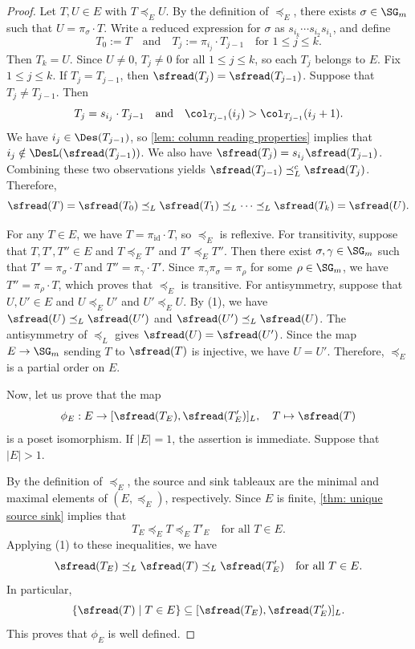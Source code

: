 \documentclass[12pt, reqno]{amsart}
\numberwithin{equation}{section}
\numberwithin{figure}{section}
\numberwithin{table}{section}
\theoremstyle{definition}
\begin{document}
\begin{proof}
Let $T,U \in E$ with $T \preceq_E U$.
By the definition of $\preceq_E$, there exists $\sigma \in \SG_m$ such that $U = \pi_\sigma \cdot T$.
Write a reduced expression for $\sigma$ as $s_{i_k}\cdots s_{i_2}s_{i_1}$, and define 
\[
T_0:=T 
\quad \text{and} \quad
T_j:=\pi_{i_j} \cdot T_{j-1}
\quad\text{for } 1 \le j \le k.
\]
Then $T_k = U$.
Since $U \ne 0$, $T_j \ne 0$ for all $1 \le j \le k$, so each $T_j$ belongs to $E$.
Fix $1 \le j \le k$.
If $T_j = T_{j-1}$, then $\sfread(T_j) = \sfread(T_{j-1})$.
Suppose that $T_j \ne T_{j-1}$.
Then 
\[
T_j = s_{i_j} \cdot T_{j-1}
\quad \text{and} \quad
\col_{T_{j-1}}(i_j) > \col_{T_{j-1}}(i_j+1).
\]
We have $i_j \in \Des(T_{j-1})$, so \cref{lem: column reading properties} implies that $i_j \notin \DesL(\sfread(T_{j-1}))$.
We also have $\sfread(T_j)=s_{i_j}\sfread(T_{j-1})$.
Combining these two observations yields $\sfread(T_{j-1}) \preceq_L^c \sfread(T_j)$.
Therefore,
\[
\sfread(T) = \sfread(T_0)
\preceq_L \sfread(T_1)
\preceq_L \cdots
\preceq_L \sfread(T_k) = \sfread(U).
\]


For any $T \in E$, we have $T = \pi_{\mathrm{id}} \cdot T$, so $\preceq_E$ is reflexive.
For transitivity, suppose that $T,T',T'' \in E$ and $T \preceq_E T'$ and $T' \preceq_E T''$.
Then there exist $\sigma,\gamma \in \SG_m$ such that $T' = \pi_\sigma \cdot T$ and $T'' = \pi_\gamma \cdot T'$.
Since $\pi_\gamma\pi_\sigma = \pi_\rho$ for some $\rho \in \SG_m$, we have $T'' = \pi_\rho \cdot T$, which proves that $\preceq_E$ is transitive.
For antisymmetry, suppose that $U, U' \in E$ and $U \preceq_E U'$ and $U' \preceq_E U$.
By (1), we have $\sfread(U) \preceq_L \sfread(U')$ and $\sfread(U') \preceq_L \sfread(U)$.
The antisymmetry of $\preceq_L$ gives $\sfread(U) = \sfread(U')$.
Since the map $E \to \SG_m$ sending $T$ to $\sfread(T)$ is injective, we have $U = U'$.
Therefore, $\preceq_E$ is a partial order on $E$.


Now, let us prove that the map
\[
\phi_E:E\to[\sfread(T_E),\sfread(T'_E)]_L,
\quad
T \mapsto \sfread(T)
\]
is a poset isomorphism.
If $|E|=1$, the assertion is immediate.
Suppose that $|E|>1$.

By the definition of $\preceq_E$, the source and sink tableaux are the minimal and maximal elements of $(E,\preceq_E)$, respectively.
Since $E$ is finite, \cref{thm: unique source sink} implies that
\[
T_E\preceq_E T\preceq_E T'_E
\quad \text{for all } T \in E.
\]
Applying (1) to these inequalities, we have
\[
\sfread(T_E) \preceq_L \sfread(T) \preceq_L \sfread(T'_E) 
\quad \text{for all } T \in E.
\]
In particular,
\[
\{\sfread(T)\mid T \in E\}
\subseteq
[\sfread(T_E),\sfread(T'_E)]_L.
\]
This proves that $\phi_E$ is well defined.


\end{proof}
\end{document}
